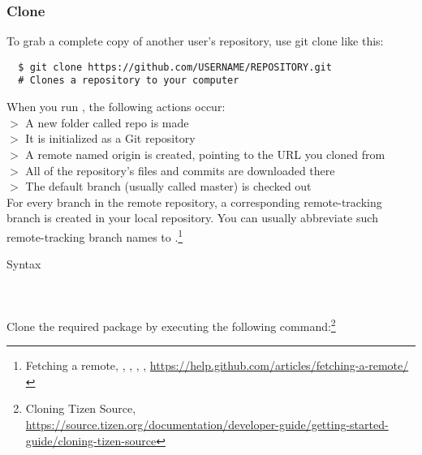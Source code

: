 
\newpage
\subsubsection{Clone}
To grab a complete copy of another user's repository, use git clone like this:

\begin{Verbatim}
  $ git clone https://github.com/USERNAME/REPOSITORY.git
  # Clones a repository to your computer
\end{Verbatim}

\noindent When you run , the following actions occur:\\
$>$ A new folder called repo is made\\
$>$ It is initialized as a Git repository\\
$>$ A remote named origin is created, pointing to the URL you cloned from\\
$>$ All of the repository's files and commits are downloaded there\\
$>$ The default branch (usually called master) is checked out\\

\noindent For every branch  in the remote repository, a corresponding remote-tracking
branch  is created in your local repository.  You can
usually abbreviate such remote-tracking branch names to .\footnote{Fetching a remote,
, , , ,
\href{https://help.github.com/articles/fetching-a-remote/}{https://help.github.com/articles/fetching-a-remote/}}

\vspace{20pt}
\noindent\begin{bf}Syntax\end{bf}
\\
\\
\noindent Clone the required package by executing the following
command:\footnote{Cloning Tizen Source,\\
\href{https://source.tizen.org/documentation/developer-guide/getting-started-guide/cloning-tizen-source}{https://source.tizen.org/documentation/developer-guide/getting-started-guide/cloning-tizen-source}}

